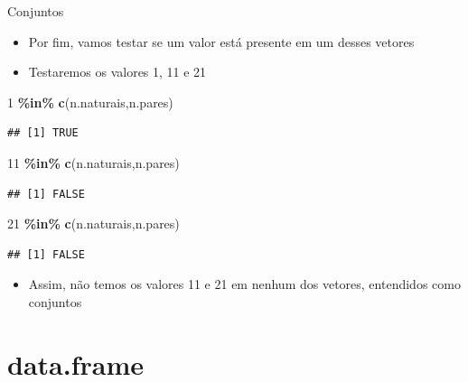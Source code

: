 \documentclass[
  10pt,
  ignorenonframetext,
]{beamer}
\newenvironment{Shaded}{\begin{snugshade}}{\end{snugshade}}
\newcommand{\DecValTok}[1]{\textcolor[rgb]{0.00,0.00,0.81}{#1}}
\newcommand{\KeywordTok}[1]{\textcolor[rgb]{0.13,0.29,0.53}{\textbf{#1}}}
\newcommand{\NormalTok}[1]{#1}
\newcommand{\OperatorTok}[1]{\textcolor[rgb]{0.81,0.36,0.00}{\textbf{#1}}}
\newcommand{\StringTok}[1]{\textcolor[rgb]{0.31,0.60,0.02}{#1}}
\providecommand{\tightlist}{%
  \setlength{\itemsep}{0pt}\setlength{\parskip}{0pt}}
\begin{document}
\begin{frame}[fragile]{Conjuntos}
\protect\hypertarget{conjuntos-3}{}
\begin{itemize}
\tightlist
\item
  Por fim, vamos testar se um valor está presente em um desses vetores
\item
  Testaremos os valores 1, 11 e 21
\end{itemize}

\begin{Shaded}
\begin{Highlighting}[]
\DecValTok{1} \OperatorTok{\%in\%}\StringTok{ }\KeywordTok{c}\NormalTok{(n.naturais,n.pares)}
\end{Highlighting}
\end{Shaded}

\begin{verbatim}
## [1] TRUE
\end{verbatim}

\begin{Shaded}
\begin{Highlighting}[]
\DecValTok{11} \OperatorTok{\%in\%}\StringTok{ }\KeywordTok{c}\NormalTok{(n.naturais,n.pares)}
\end{Highlighting}
\end{Shaded}

\begin{verbatim}
## [1] FALSE
\end{verbatim}

\begin{Shaded}
\begin{Highlighting}[]
\DecValTok{21} \OperatorTok{\%in\%}\StringTok{ }\KeywordTok{c}\NormalTok{(n.naturais,n.pares)}
\end{Highlighting}
\end{Shaded}

\begin{verbatim}
## [1] FALSE
\end{verbatim}

\begin{itemize}
\tightlist
\item
  Assim, não temos os valores 11 e 21 em nenhum dos vetores, entendidos
  como conjuntos
\end{itemize}
\end{frame}

\hypertarget{data.frame}{%
\section{data.frame}\label{data.frame}}
\end{document}
